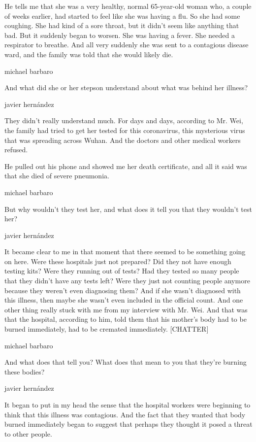 He tells me that she was a very healthy, normal 65-year-old woman who, a
couple of weeks earlier, had started to feel like she was having a flu.
So she had some coughing. She had kind of a sore throat, but it didn't
seem like anything that bad. But it suddenly began to worsen. She was
having a fever. She needed a respirator to breathe. And all very
suddenly she was sent to a contagious disease ward, and the family was
told that she would likely die.

michael barbaro

And what did she or her stepson understand about what was behind her
illness?

javier hernández

They didn't really understand much. For days and days, according to Mr.
Wei, the family had tried to get her tested for this coronavirus, this
mysterious virus that was spreading across Wuhan. And the doctors and
other medical workers refused.

He pulled out his phone and showed me her death certificate, and all it
said was that she died of severe pneumonia.

michael barbaro

But why wouldn't they test her, and what does it tell you that they
wouldn't test her?

javier hernández

It became clear to me in that moment that there seemed to be something
going on here. Were these hospitals just not prepared? Did they not have
enough testing kits? Were they running out of tests? Had they tested so
many people that they didn't have any tests left? Were they just not
counting people anymore because they weren't even diagnosing them? And
if she wasn't diagnosed with this illness, then maybe she wasn't even
included in the official count. And one other thing really stuck with me
from my interview with Mr. Wei. And that was that the hospital,
according to him, told them that his mother's body had to be burned
immediately, had to be cremated immediately. {[}CHATTER{]}

michael barbaro

And what does that tell you? What does that mean to you that they're
burning these bodies?

javier hernández

It began to put in my head the sense that the hospital workers were
beginning to think that this illness was contagious. And the fact that
they wanted that body burned immediately began to suggest that perhaps
they thought it posed a threat to other people.

